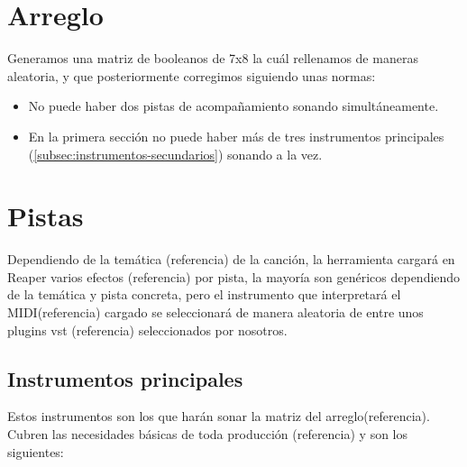 \section{Arreglo}

Generamos una matriz de booleanos de 7x8 la cuál rellenamos de maneras aleatoria, y que posteriormente corregimos siguiendo unas normas:

\begin{itemize}

\item No puede haber dos pistas de acompañamiento sonando simultáneamente.
\item En la primera sección no puede haber más de tres instrumentos principales (\ref{subsec:instrumentos-secundarios}) sonando a la vez.
\end{itemize}

\section{Pistas}

Dependiendo de la temática (referencia) de la canción, la herramienta cargará en Reaper varios efectos (referencia) por pista, la mayoría son genéricos dependiendo de la temática y pista concreta, pero el instrumento que interpretará el MIDI(referencia) cargado se seleccionará de manera aleatoria de entre unos plugins vst (referencia) seleccionados por nosotros.

\subsection{Instrumentos principales}
\label{subsec:instrumentos-principales}
Estos instrumentos son los que harán sonar la matriz del arreglo(referencia). Cubren las necesidades básicas de toda producción (referencia) y son los siguientes:

